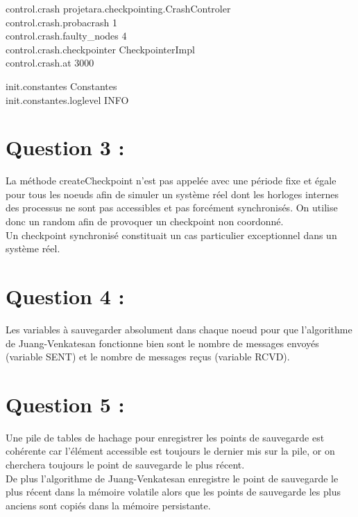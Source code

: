 \documentclass[11pt,a4paper]{report}
\begin{document}
control.crash projetara.checkpointing.CrashControler\\
control.crash.probacrash 1\\
control.crash.faulty\_nodes 4\\
control.crash.checkpointer CheckpointerImpl\\
control.crash.at 3000

init.constantes Constantes\\
init.constantes.loglevel INFO\\


\section{Question 3 :}

La méthode createCheckpoint n'est pas appelée avec une période fixe et égale pour tous les noeuds afin de simuler un système réel dont les horloges internes des processus ne sont pas accessibles et pas forcément synchronisés. On utilise donc un random afin de provoquer un checkpoint non coordonné.\\

Un checkpoint synchronisé constituait un cas particulier exceptionnel dans un système réel.\\


\section{Question 4 :}

Les variables à sauvegarder absolument dans chaque noeud pour que l'algorithme de Juang-Venkatesan fonctionne bien sont le nombre de messages envoyés (variable SENT) et le nombre de messages reçus (variable RCVD).\\

\section{Question 5 :}

Une pile de tables de hachage pour enregistrer les points de sauvegarde est cohérente car l'élément accessible est toujours le dernier mis sur la pile, or on cherchera toujours le point de sauvegarde le plus récent.\\

De plus l'algorithme de Juang-Venkatesan enregistre le point de sauvegarde le plus récent dans la mémoire volatile alors que les points de sauvegarde les plus anciens sont copiés dans la mémoire persistante.\\
\end{document}
